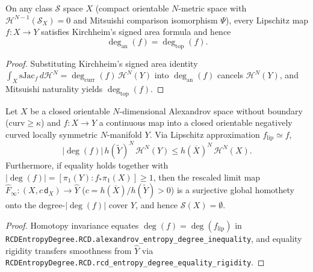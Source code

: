 \begin{theorem}
\label{thm_analytic_eq_topological_degree}
\leanok
{}
On any class $\mathcal{S}$ space $X$ (compact orientable $N$-metric space with
$\mathcal{H}^{N-1}(\mathcal{S}_X) = 0$ and Mitsuishi comparison isomorphism $\Psi$), every
Lipschitz map $f : X \to Y$ satisfies Kirchheim's signed area formula and hence
\[
  \deg_{\mathrm{an}}(f) = \deg_{\mathrm{top}}(f).
\]
\end{theorem}
\begin{proof}\leanok
Substituting Kirchheim's signed area identity $\int_X \mathrm{sJac}_f\,d\mathcal{H}^N =
\deg_{\mathrm{curr}}(f)\,\mathcal{H}^N(Y)$ into $\deg_{\mathrm{an}}(f)$ cancels $\mathcal{H}^N(Y)$,
and Mitsuishi naturality yields $\deg_{\mathrm{top}}(f)$.
\end{proof}

\begin{theorem}
\label{thm_alexandrov_entropy_degree}
\leanok
{}
Let $X$ be a closed orientable $N$-dimensional Alexandrov space without boundary
($\mathrm{curv} \ge \kappa$) and $f : X \to Y$ a continuous map into a closed orientable
negatively curved locally symmetric $N$-manifold $Y$. Via Lipschitz approximation
$f_{\mathrm{lip}} \simeq f$,
\[
  |\deg(f)| \, h(\widetilde{Y})^N \, \mathcal{H}^N(Y) \le h(\overline{X})^N \, \mathcal{H}^N(X).
\]
Furthermore, if equality holds together with $|\deg(f)| = [\pi_1(Y) : f_*\pi_1(X)] \ge 1$, then
the rescaled limit map $\hat{F}_\infty : (X, c\,\mathsf{d}_X) \to \widehat{Y}$
($c = h(\overline{X})/h(\widetilde{Y}) > 0$) is a surjective global homothety onto the
degree-$|\deg(f)|$ cover $\widehat{Y}$, and hence $\mathcal{S}(X) = \emptyset$.
\end{theorem}
\begin{proof}\leanok
Homotopy invariance equates $\deg(f) = \deg(f_{\mathrm{lip}})$ in
\texttt{RCDEntropyDegree.RCD.alexandrov\_entropy\_degree\_inequality}, and equality rigidity transfers smoothness
from $\widehat{Y}$ via \texttt{RCDEntropyDegree.RCD.rcd\_entropy\_degree\_equality\_rigidity}.
\end{proof}

